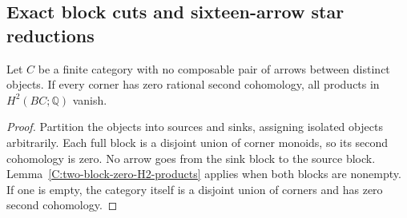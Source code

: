 \subsection{Exact block cuts and sixteen-arrow star reductions}

\begin{corollary}
\label{C:height-one-zero-H2-products}
Let $C$ be a finite category with no composable pair of arrows
between distinct objects.  If every corner has zero rational
second cohomology, all products in $H^2(BC;\mathbb Q)$ vanish.
\end{corollary}
\begin{proof}
Partition the objects into sources and sinks, assigning isolated
objects arbitrarily.  Each full block is a disjoint union of
corner monoids, so its second cohomology is zero.  No arrow
goes from the sink block to the source block.
Lemma~\ref{C:two-block-zero-H2-products} applies when both
blocks are nonempty.  If one is empty, the category itself is
a disjoint union of corners and has zero second cohomology.
\end{proof}

